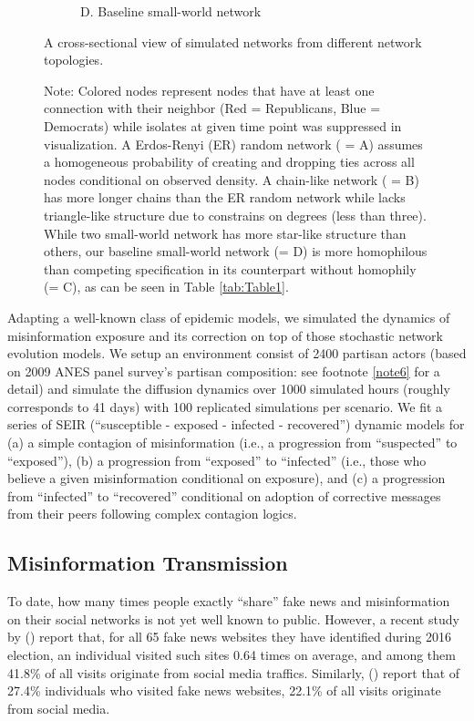 \documentclass[man, 12pt, a4paper, nolmodern, noextraspace]{apa6}
\begin{document}
\begin{figure}
\begin{subfigure}[t]{0.45\textwidth}
        \caption*{D. Baseline small-world network} \label{fig1:smallworld}
    \end{subfigure}
    
    \vspace{1cm}
    \captionsetup{format=hang}
    \caption{A cross-sectional view of simulated networks from different network topologies.} 
    \label{fig:Figure1}
    \captionsetup{font=small}
    \caption*{Note: Colored nodes represent nodes that have at least one connection with their neighbor (Red = Republicans, Blue = Democrats) while isolates at given time point was suppressed in visualization. A Erdos-Renyi (ER) random network ( = A) assumes a homogeneous probability of creating and dropping ties across all nodes conditional on observed density. A chain-like network ( = B) has more longer chains than the ER random network while lacks triangle-like structure due to constrains on degrees (less than three). While two small-world network has more star-like structure than others, our baseline small-world network (= D) is more homophilous than competing specification in its counterpart without homophily (= C), as can be seen in Table \ref{tab:Table1}.} 
\end{figure}    

  Adapting a well-known class of epidemic models, we simulated the dynamics of misinformation exposure and its correction on top of those stochastic network evolution models. We setup an environment consist of 2400 partisan actors (based on 2009 ANES panel survey's partisan composition: see footnote \ref{note6} for a detail) and simulate the diffusion dynamics over 1000 simulated hours (roughly corresponds to 41 days) with 100 replicated simulations per scenario. We fit a series of SEIR (\enquote{susceptible - exposed - infected - recovered}) dynamic models for (a) a simple contagion of misinformation (i.e., a progression from \enquote{suspected} to \enquote{exposed}), (b) a progression from \enquote{exposed} to \enquote{infected} (i.e., those who believe a given misinformation conditional on exposure), and (c) a progression from \enquote{infected} to \enquote{recovered} conditional on adoption of corrective messages from their peers following complex contagion logics. 

\subsection{Misinformation Transmission}
    
    To date, how many times people exactly \enquote{share} fake news and misinformation on their social networks is not yet well known to public. However, a recent study by \citeauthor{allcott2017social} (\citeyear{allcott2017social}) report that, for all 65 fake news websites they have identified during 2016 election, an individual visited such sites 0.64 times on average, and among them 41.8\% of all visits originate from social media traffics. Similarly, \citeauthor{guess2018selective} (\citeyear{guess2018selective}) report that of 27.4\% individuals who visited fake news websites, 22.1\% of all visits originate from social media. 
\end{document}
